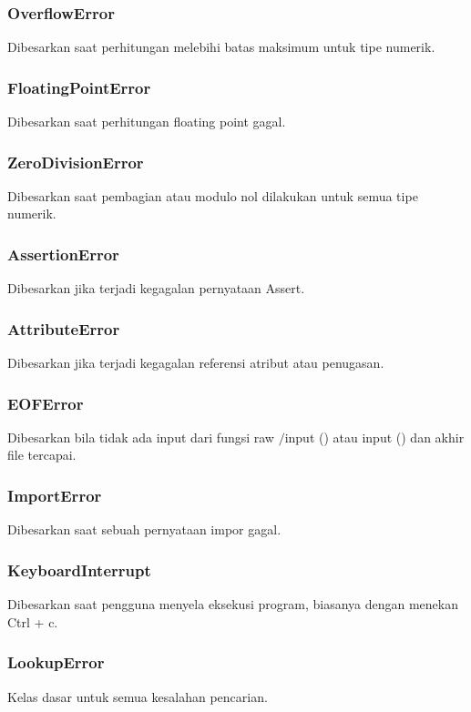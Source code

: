 \subsubsection{OverflowError}
Dibesarkan saat perhitungan melebihi batas maksimum untuk tipe numerik.

\subsubsection{FloatingPointError}
Dibesarkan saat perhitungan floating point gagal.

\subsubsection{ZeroDivisionError}
Dibesarkan saat pembagian atau modulo nol dilakukan untuk semua tipe numerik.

\subsubsection{AssertionError}
Dibesarkan jika terjadi kegagalan pernyataan Assert.

\subsubsection{AttributeError}
Dibesarkan jika terjadi kegagalan referensi atribut atau penugasan. 

\subsubsection{EOFError}
Dibesarkan bila tidak ada input dari fungsi raw $ / $input () atau input () dan akhir file tercapai.

\subsubsection{ImportError}
Dibesarkan saat sebuah pernyataan impor gagal.

\subsubsection{KeyboardInterrupt}
Dibesarkan saat pengguna menyela eksekusi program, biasanya dengan menekan Ctrl + c.

\subsubsection{LookupError}
Kelas dasar untuk semua kesalahan pencarian.

